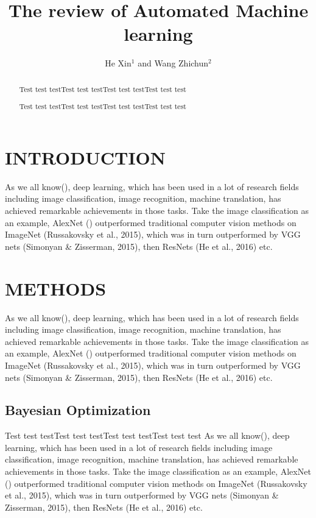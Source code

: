 \documentclass[a4paper, 10pt, conference]{ieeeconf}
\title{\LARGE \bf
The review of Automated Machine learning
}
\author{He Xin$^{1}$ and Wang Zhichun$^{2}$
}
\begin{document}
\maketitle

\begin{abstract}

Test test testTest test testTest test testTest test test

Test test testTest test testTest test testTest test test


\end{abstract}

\section{INTRODUCTION}

As we all know(\cite{xie_genetic_2017}), deep learning, which has been used in a lot of research fields including image classification, image recognition, machine translation, has achieved remarkable achievements in those tasks. Take the image classification as an example, AlexNet () outperformed traditional computer vision methods on ImageNet (Russakovsky et al., 2015), which was in turn outperformed by VGG nets (Simonyan \& Zisserman, 2015), then ResNets (He et al., 2016) etc.


\section{METHODS}

As we all know(\cite{xie_genetic_2017}), deep learning, which has been used in a lot of research fields including image classification, image recognition, machine translation, has achieved remarkable achievements in those tasks. Take the image classification as an example, AlexNet () outperformed traditional computer vision methods on ImageNet (Russakovsky et al., 2015), which was in turn outperformed by VGG nets (Simonyan \& Zisserman, 2015), then ResNets (He et al., 2016) etc.


\subsection{Bayesian Optimization}

Test test testTest test testTest test testTest test test
As we all know(\cite{xie_genetic_2017}), deep learning, which has been used in a lot of research fields including image classification, image recognition, machine translation, has achieved remarkable achievements in those tasks. Take the image classification as an example, AlexNet () outperformed traditional computer vision methods on ImageNet (Russakovsky et al., 2015), which was in turn outperformed by VGG nets (Simonyan \& Zisserman, 2015), then ResNets (He et al., 2016) etc.
\end{document}
